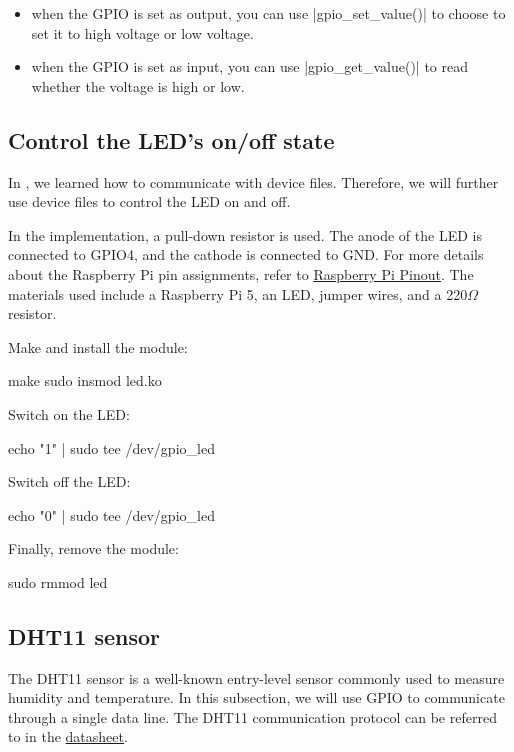 \documentclass[10pt, oneside]{book}
\begin{document}
\begin{itemize}
  \item when the GPIO is set as output, you can use \cpp|gpio_set_value()| to choose to set it to high voltage or low voltage.
  \item when the GPIO is set as input, you can use \cpp|gpio_get_value()| to read whether the voltage is high or low.
\end{itemize}

\subsection{Control the LED's on/off state}
\label{sec:gpio_led}
In , we learned how to communicate with device files.
Therefore, we will further use device files to control the LED on and off.

In the implementation, a pull-down resistor is used.
The anode of the LED is connected to GPIO4, and the cathode is connected to GND.
For more details about the Raspberry Pi pin assignments, refer to \href{https://pinout.xyz/}{Raspberry Pi Pinout}.
The materials used include a Raspberry Pi 5, an LED, jumper wires, and a 220$\Omega$ resistor.


Make and install the module:
\begin{codebash}
make
sudo insmod led.ko
\end{codebash}

Switch on the LED:
\begin{codebash}
echo "1" | sudo tee /dev/gpio_led
\end{codebash}

Switch off the LED:
\begin{codebash}
echo "0" | sudo tee /dev/gpio_led
\end{codebash}

Finally, remove the module:
\begin{codebash}
sudo rmmod led
\end{codebash}

\subsection{DHT11 sensor}
\label{sec:gpio_dht11}
The DHT11 sensor is a well-known entry-level sensor commonly used to measure humidity and temperature.
In this subsection, we will use GPIO to communicate through a single data line.
The DHT11 communication protocol can be referred to in the \href{https://www.mouser.com/datasheet/2/758/DHT11-Technical-Data-Sheet-Translated-Version-1143054.pdf?srsltid=AfmBOoppls-QTd864640bVtbK90sWBsFzJ_7SgjOD2EpwuLLGUSTyYnv}{datasheet}.
\end{document}

